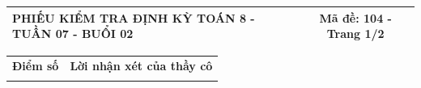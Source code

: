 \documentclass[12pt,a4paper]{article}
\begin{document}
\newpage
\noindent
\begin{tabularx}{\linewidth}{|X|c|}
\hline
\textbf{PHIẾU KIỂM TRA ĐỊNH KỲ TOÁN 8 - TUẦN 07 - BUỔI 02} & \textbf{Mã đề: 104 - Trang 1/2} \\
\hline
\end{tabularx}

\vspace{1.2mm}

\noindent
\begin{tabularx}{\linewidth}{|p{3.2cm}|X|}
\hline
\centering\textbf{Điểm số} & \centering\textbf{Lời nhận xét của thầy cô} \tabularnewline
\rule{0pt}{1.8cm} & \\
\hline
\end{tabularx}

\vspace{1.2mm}
\end{document}
